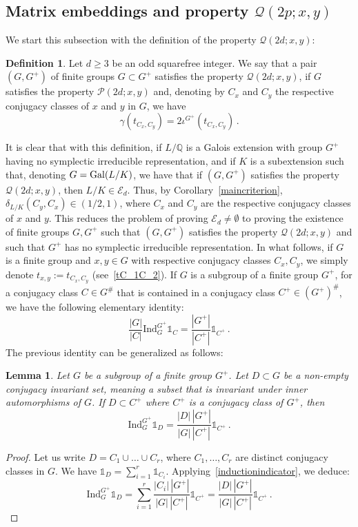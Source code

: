 \documentclass[12pt]{amsart}
\numberwithin{equation}{section}
\newcommand{\Gal}{{\rm Gal}}
\newcommand{\Q}{\mathbb Q}
\newtheorem{lem}[X]{Lemma}
\theoremstyle{definition}
\newtheorem{defi}[X]{Definition}
\theoremstyle{remark}
\begin{document}
\subsection{Matrix embeddings and property $\mathcal{Q}(2p;x,y)$}\label{subsec:propQ}
We start this subsection with the definition of the property $\mathcal{Q}(2d;x,y)$:
\begin{defi}\label{propertyQ}
    Let $d\ge 3$ be an odd squarefree integer. We say that a pair $(G,G^+)$ of finite groups $G\subset G^+$ satisfies the property $\mathcal{Q}(2d;x,y)$, if $G$ satisfies the property $\mathcal{P}(2d;x,y)$ and, denoting by $C_x$ and $C_y$ the respective conjugacy classes of $x$ and $y$ in $G$, we have \[\gamma\left(t_{C_x,C_y}\right)=2\iota^{G^+}\left(t_{C_x,C_y}\right)\, .\]
\end{defi}
It is clear that with this definition, if $L/\Q$ is a Galois extension with group $G^+$ having no symplectic irreducible representation, and if $K$ is a subextension such that, denoting $G=\Gal(L/K)$, we have that if $(G,G^+)$ satisfies the property $\mathcal{Q}(2d;x,y)$, then $L/K\in \mathcal{E}_d$. Thus, by Corollary~\ref{maincriterion}, $\delta_{L/K}(C_y,C_x)\in (1/2,1)$, where $C_x$ and $C_y$ are the respective conjugacy classes of $x$ and $y$. This reduces the problem of proving $\mathcal{E}_d\ne \emptyset$ to proving the existence of finite groups $G,G^+$ such that $(G,G^+)$ satisfies the property $\mathcal{Q}(2d;x,y)$ and such that $G^+$ has no symplectic irreducible representation. In what follows, if $G$ is a finite group and $x,y\in G$ with respective conjugacy classes $C_x,C_y$, we simply denote $t_{x,y}:=t_{C_x,C_y}$ (see~\eqref{tC_1C_2}). If $G$ is a subgroup of a finite group $G^+$, for a conjugacy class $C\in G^\#$ that is contained in a conjugacy class $C^+\in (G^+)^\#$, we have the following elementary identity: \begin{equation}\label{inductionindicator}
    \frac{|G|}{|C|}\mathrm{Ind}_G^{G^+} \mathds{1}_C =\frac{|G^+|}{|C^+|}\mathds{1}_{C^+}\, .
\end{equation}
The previous identity can be generalized as follows: 
\begin{lem}\label{invconjset-induction}
    Let $G$ be a subgroup of a finite group $G^+$. Let $D\subset G$ be a non-empty conjugacy invariant set, meaning a subset that is invariant under inner automorphisms of $G$. If $D\subset C^+$ where $C^+$ is a conjugacy class of $G^+$, then \[\mathrm{Ind}_G^{G^+} \mathds{1}_D=\frac{|D|\, |G^+|}{|G|\, |C^+|}\mathds{1}_{C^+}\, .\]
\end{lem}
\begin{proof}
    Let us write $D=C_1\cup\dots\cup C_r$, where $C_1,\dots,C_r$ are distinct conjugacy classes in $G$. We have $\mathds{1}_D=\sum_{i=1}^r\mathds{1}_{C_i}$. Applying~\eqref{inductionindicator}, we deduce: 
    \[\mathrm{Ind}_G^{G^+} \mathds{1}_D=\sum_{i=1}^r \frac{|C_i|\, |G^+|}{|G|\, |C^+|}\mathds{1}_{C^+}=\frac{|D|\, |G^+|}{|G|\, |C^+|}\mathds{1}_{C^+}\, .\]
\end{proof}
\end{document}
